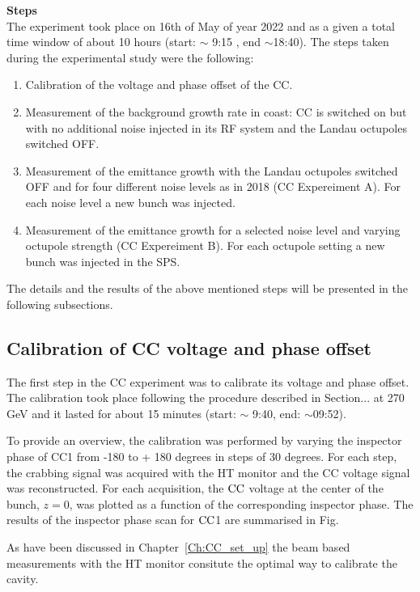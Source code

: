 \textbf{Steps}\\
The experiment took place on 16th of May of year 2022 and as a given a total time window of about 10 hours (start: $\sim$ 9:15 , end $\sim$18:40). The steps taken during the experimental study were the following:

\begin{enumerate}
   \item Calibration of the voltage and phase offset of the CC.
   \item Measurement of the background growth rate in coast: CC is switched on but with no additional noise injected in its RF system and the Landau octupoles switched OFF.
   \item Measurement of the emittance growth with the Landau octupoles switched OFF and for four different noise levels as in 2018 (CC Expereiment A). For each noise level a new bunch was injected.
   \item Measurement of the emittance growth for a selected noise level and varying octupole strength (CC Expereiment B). For each octupole setting a new bunch was injected in the SPS.
\end{enumerate}


The details and the results of the above mentioned steps will be presented in the following subsections.

\subsection{Calibration of CC voltage and phase offset}\label{subsec:cc_calibration_2022}
The first step in the CC experiment was to calibrate its voltage and phase offset. The calibration took place following the procedure described in Section... at 270\,GeV and it lasted for about 15 minutes (start: $\sim$ 9:40, end: $\sim$09:52).

To provide an overview, the calibration was performed by varying the inspector phase of CC1 from -180 to + 180 degrees in steps of 30 degrees. For each step, the crabbing signal was acquired with the HT monitor and the CC voltage signal was reconstructed. For each acquisition, the ${\mathrm{CC}}$ voltage at the center of the bunch, $z=0$, was plotted as a function of the corresponding inspector phase. The results of the inspector phase scan for ${\mathrm{CC}}$1 are summarised in Fig.





As have been discussed in Chapter~\ref{Ch:CC_set_up} the beam based measurements with the HT monitor consitute the optimal way to calibrate the cavity.

